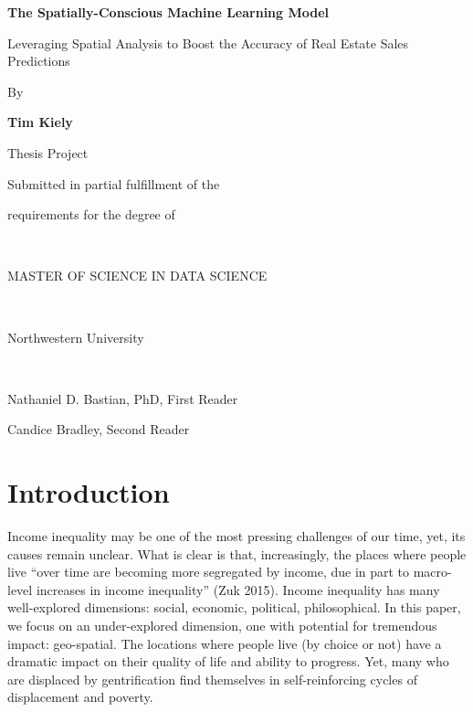 \documentclass[12pt,]{article}
\title{}
\author{}
\date{}
\begin{document}

\titlepage
\center
\vspace{4 cm}
\LARGE

\bf 
The Spatially-Conscious Machine Learning Model  

\Large

Leveraging Spatial Analysis to Boost the Accuracy of Real Estate Sales
Predictions

\rm
\normalsize

By

\textbf{Tim Kiely}

Thesis Project

Submitted in partial fulfillment of the

requirements for the degree of

~

MASTER OF SCIENCE IN DATA SCIENCE

~

Northwestern University

~

Nathaniel D. Bastian, PhD, First Reader

Candice Bradley, Second Reader

\newpage
\normalsize
\singlespace
\tableofcontents
\doublespace
\newpage
{}

\pagestyle{plain}
\justify

\hypertarget{introduction}{%
\section{Introduction}\label{introduction}}

Income inequality may be one of the most pressing challenges of our
time, yet, its causes remain unclear. What is clear is that,
increasingly, the places where people live ``over time are becoming more
segregated by income, due in part to macro-level increases in income
inequality'' (Zuk 2015). Income inequality has many well-explored
dimensions: social, economic, political, philosophical. In this paper,
we focus on an under-explored dimension, one with potential for
tremendous impact: geo-spatial. The locations where people live (by
choice or not) have a dramatic impact on their quality of life and
ability to progress. Yet, many who are displaced by gentrification find
themselves in self-reinforcing cycles of displacement and poverty.
\end{document}
